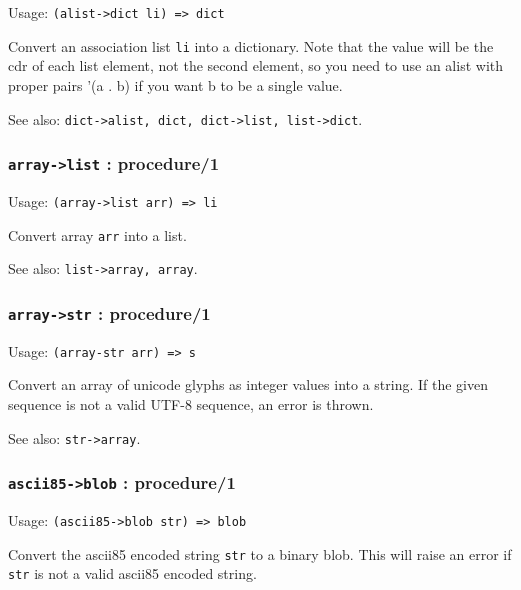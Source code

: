 \documentclass[
]{article}
\newcommand{\passthrough}[1]{#1}
\begin{document}
Usage: \passthrough{\lstinline!(alist->dict li) => dict!}

Convert an association list \passthrough{\lstinline!li!} into a
dictionary. Note that the value will be the cdr of each list element,
not the second element, so you need to use an alist with proper pairs
'(a . b) if you want b to be a single value.

See also:
\passthrough{\lstinline!dict->alist, dict, dict->list, list->dict!}.

\hypertarget{array-list-procedure1}{%
\subsubsection{\texorpdfstring{\texttt{array-\textgreater{}list} :
procedure/1}{array-\textgreater list : procedure/1}}\label{array-list-procedure1}}

Usage: \passthrough{\lstinline!(array->list arr) => li!}

Convert array \passthrough{\lstinline!arr!} into a list.

See also: \passthrough{\lstinline!list->array, array!}.

\hypertarget{array-str-procedure1}{%
\subsubsection{\texorpdfstring{\texttt{array-\textgreater{}str} :
procedure/1}{array-\textgreater str : procedure/1}}\label{array-str-procedure1}}

Usage: \passthrough{\lstinline!(array-str arr) => s!}

Convert an array of unicode glyphs as integer values into a string. If
the given sequence is not a valid UTF-8 sequence, an error is thrown.

See also: \passthrough{\lstinline!str->array!}.

\hypertarget{ascii85-blob-procedure1}{%
\subsubsection{\texorpdfstring{\texttt{ascii85-\textgreater{}blob} :
procedure/1}{ascii85-\textgreater blob : procedure/1}}\label{ascii85-blob-procedure1}}

Usage: \passthrough{\lstinline!(ascii85->blob str) => blob!}

Convert the ascii85 encoded string \passthrough{\lstinline!str!} to a
binary blob. This will raise an error if \passthrough{\lstinline!str!}
is not a valid ascii85 encoded string.
\end{document}
